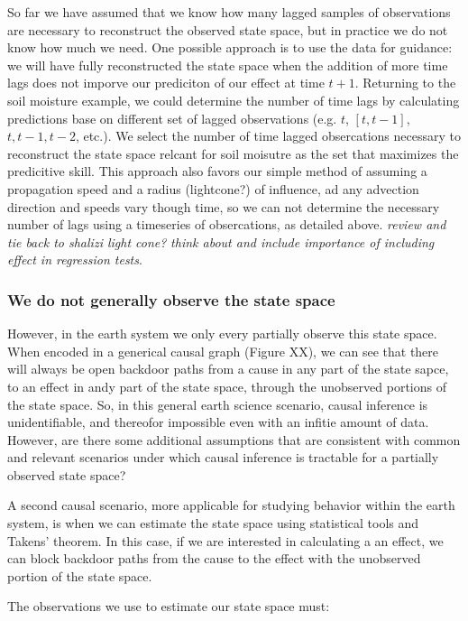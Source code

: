 \documentclass[12pt]{article}
\begin{document}
So far we have assumed that we know how many lagged samples of
observations are necessary to reconstruct the observed state
space, but in practice we do not know how much we need. One
possible approach is to use the data for guidance: we will have
fully reconstructed the state space when the addition of
more time lags does not imporve our prediciton of our effect at
time \(t+1\). Returning to the soil moisture example, we could
determine the number of time lags by calculating predictions base
on different set of lagged observations (e.g. \({t}\), \([t, t-1]\),
\({t, t-1, t-2}\), etc.). We select the number of time lagged
obsercations necessary to reconstruct the state space relcant for
soil moisutre as the set that maximizes the predicitive
skill. This approach also favors our simple method of assuming a
propagation speed and a radius (lightcone?) of influence, ad any
advection direction and speeds vary though time, so we can not
determine the necessary number of lags using a timeseries of
obsercations, as detailed above. \emph{review and tie back to shalizi
light cone?} \emph{think about and include importance of including
effect in regression tests}.


\subsubsection{We do not generally observe the state space}

However, in
the earth system we only every partially observe this state
space. When encoded in a generical causal graph (Figure XX), we
can see that there will always be open backdoor paths from a cause
in any part of the state sapce, to an effect in andy part of the
state space, through the unobserved portions of the state
space. So, in this general earth science scenario, causal
inference is unidentifiable, and thereofor impossible even with an
infitie amount of data. However, are there some additional
assumptions that are consistent with common and relevant scenarios
under which causal inference is tractable for a partially observed
state space?


A second causal scenario, more applicable for studying behavior
within the earth system, is when we can estimate the state space
using statistical tools and Takens' theorem. In this case, if we
are interested in calculating a an effect, we can block backdoor
paths from the cause to the effect with the unobserved portion of
the state space.

The observations we use to estimate our state space
must:
\end{document}
